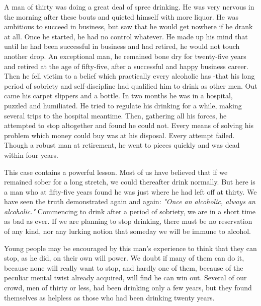 \begin{biblechapter}
    A man of thirty was doing a great deal of spree drinking. 
\verse He was very nervous in the morning after these bouts 
    and quieted himself with more liquor. 
\verse He was ambitious to succeed in business, 
    but saw that he would get nowhere if he drank at all. 
\verse Once he started, he had no control whatever. 
\verse He made up his mind that 
    until he had been successful in business and had retired, 
    he would not touch another drop. 
\verse An exceptional man, he remained bone dry for twenty-five years 
    and retired at the age of fifty-five, 
    after a successful and happy business career. 
\verse Then he fell victim to a belief which practically every alcoholic has
    -that his long period of sobriety and self-discipline 
    had qualified him to drink as other men. 
\verse Out came his carpet slippers and a bottle. 
\verse In two months he was in a hospital, puzzled and humiliated. 
\verse He tried to regulate his drinking for a while, 
\verse making several trips to the hospital meantime. 
\verse Then, gathering all his forces, 
    he attempted to stop altogether and found he could not. 
\verse Every means of solving his problem which money could buy was at his disposal. 
\verse Every attempt failed. 
\verse Though a robust man at retirement, 
\verse he went to pieces quickly and was dead within four years.

\verse This case contains a powerful lesson. 
\verse Most of us have believed 
    that if we remained sober for a long stretch, 
    we could thereafter drink normally. 
\verse But here is a man who at fifty-five years 
    found he was just where he had left off at thirty. 
    We have seen the truth demonstrated again and again: 
\verse \emph{"Once an alcoholic, always an alcoholic."}
\verse Commencing to drink after a period of sobriety, 
    we are in a short time as bad as ever. 
\verse If we are planning to stop drinking, 
    there must be no reservation of any kind, 
    nor any lurking notion that someday we will be immune to alcohol.

\verse Young people may be encouraged by this man's experience 
    to think that they can stop, 
    as he did, on their own will power. 
\verse We doubt if many of them can do it, 
    because none will really want to stop, 
    and hardly one of them, 
    because of the peculiar mental twist already acquired, 
    will find he can win out. 
\verse Several of our crowd, men of thirty or less, 
    had been drinking only a few years, 
    but they found themselves as helpless as those 
    who had been drinking twenty years.
\end{biblechapter}


